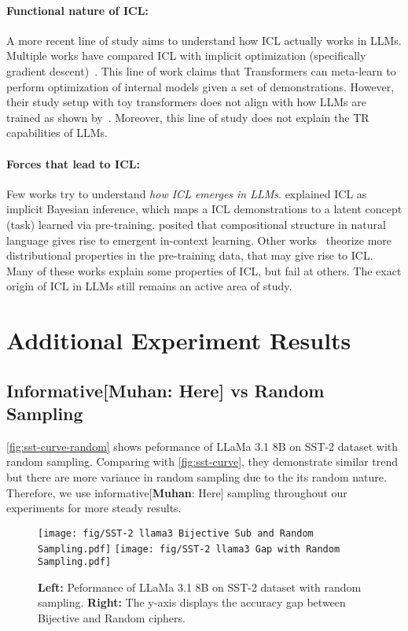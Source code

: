 \documentclass[11pt]{article}
\newcommand{\aayush}[1]{{\color{green}[{\bf Aayush}: #1]}}
\newcommand{\muhan}[1]{{\color{green}[{\bf Muhan}: #1]}}
\begin{document}
{{{{\paragraph{Functional nature of ICL:} A more recent line of study aims to understand how ICL actually works in LLMs.
Multiple works have compared ICL with implicit optimization (specifically gradient descent)~\citep{garg2022can,zhang2023trained,dai2022can,akyurek2022learning,von2023transformers,li2023closeness,kim2024transformers}. This line of work claims that Transformers can meta-learn to perform optimization of internal models given a set of demonstrations. However, their study setup with toy transformers does not align with how LLMs are trained as shown by~\citet{shen2024icl_vs_gd}. Moreover, this line of study does not explain the TR capabilities of LLMs.

\paragraph{Forces that lead to ICL:} Few works try to understand \emph{how ICL emerges in LLMs}. \citet{xie2021explanation} explained ICL as implicit Bayesian inference, which maps a ICL demonstrations to a latent concept (task) learned via pre-training. \citet{hahn2023theory} posited that compositional structure in natural language gives rise to emergent in-context learning. Other works~\citep{chan2022data} theorize more distributional properties in the pre-training data, that may give rise to ICL. Many of these works explain some properties of ICL, but fail at others.
The exact origin of ICL in LLMs still remains an active area of study.


\section{Additional Experiment Results}

\subsection{Informative\muhan{Here} vs Random Sampling}
\label{appendix:infor-random}
\autoref{fig:sst-curve-random} shows peformance of LLaMa 3.1 8B on SST-2 dataset with random sampling.
Comparing with \autoref{fig:sst-curve}, they demonstrate similar trend but there are more variance in random sampling due to the its random nature.
Therefore, we use informative\muhan{Here} sampling throughout our experiments for more steady results.
\begin{figure*}[h]
\centering
\texttt{[image: fig/SST-2 llama3 Bijective Sub and Random Sampling.pdf]}
\texttt{[image: fig/SST-2 llama3 Gap with Random Sampling.pdf]}
\caption{
\textbf{Left:} Peformance of LLaMa 3.1 8B on SST-2 dataset with random sampling. \textbf{Right:} The y-axis
displays the accuracy gap between Bijective and Random ciphers.
}\label{fig:sst-curve-random}
\end{figure*}

}}}}
\end{document}
